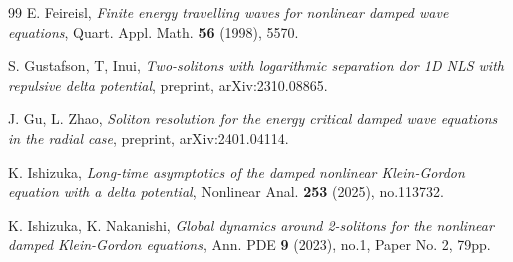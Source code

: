 \documentclass[reqno]{amsart}
\theoremstyle{plain}
\theoremstyle{definition}
\numberwithin{equation}{section}
\newcommand{\1}{\mathbbm{1}}
\begin{document}
\begin{thebibliography}{99}
 E. Feireisl,
\textit{Finite energy travelling waves for nonlinear damped wave equations}, Quart. Appl. Math. \textbf{56} (1998), 5570.






 S. Gustafson, T, Inui,
\textit{Two-solitons with logarithmic separation dor 1D NLS with repulsive delta potential},
preprint, arXiv:2310.08865.






 J. Gu, L. Zhao,
\textit{Soliton resolution for the energy critical damped wave equations in the radial case},
preprint, arXiv:2401.04114.







 K. Ishizuka,
\textit{Long-time asymptotics of the damped nonlinear Klein-Gordon equation with a delta potential},
Nonlinear Anal. \textbf{253} (2025), no.113732. 




 K. Ishizuka, K. Nakanishi,
\textit{Global dynamics around 2-solitons for the nonlinear damped Klein-Gordon equations},
Ann. PDE \textbf{9} (2023), no.1, Paper No. 2, 79pp.






\end{thebibliography}
\end{document}
